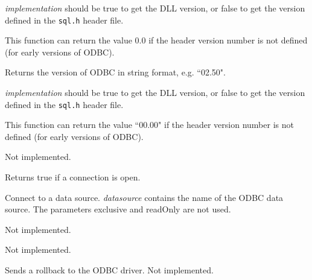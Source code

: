 {\it implementation} should be true to get the DLL version, or false to get the
version defined in the {\tt sql.h} header file.

This function can return the value 0.0 if the header version number is not defined (for early
versions of ODBC).



Returns the version of ODBC in string format, e.g. ``02.50".

{\it implementation} should be true to get the DLL version, or false to get the
version defined in the {\tt sql.h} header file.

This function can return the value ``00.00" if the header version number is not defined (for early
versions of ODBC).



Not implemented.



Returns true if a connection is open.

\label{wxdatabaseopen}


Connect to a data source. {\it datasource} contains the name of the ODBC data
source. The parameters exclusive and readOnly are not used.



Not implemented.  



Not implemented.



Sends a rollback to the ODBC driver. Not implemented.

